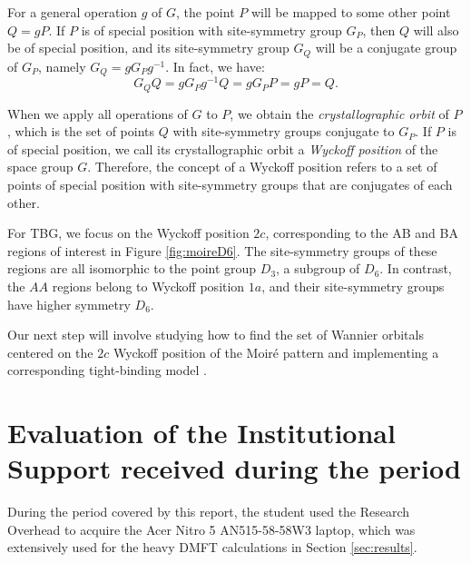 \documentclass[12pt]{report}
\begin{document}
For a general operation $g$ of $G$, the point $P$ will be mapped to some other point $Q = g P$. If $P$ is of special position with site-symmetry group $G_P$, then $Q$ will also be of special position, and its site-symmetry group $G_Q$ will be a conjugate group of $G_P$, namely $G_Q = g G_P g^{-1}$. In fact, we have:
\begin{equation} \label{eq:special-position}
G_Q Q = g G_P g^{-1} Q = g G_P P = g P = Q.
\end{equation}

When we apply all operations of $G$ to $P$, we obtain the \textit{crystallographic orbit} of $P$, which is the set of points $Q$ with site-symmetry groups conjugate to $G_P$. If $P$ is of special position, we call its crystallographic orbit a \textit{Wyckoff position} of the space group $G$. Therefore, the concept of a Wyckoff position refers to a set of points of special position with site-symmetry groups that are conjugates of each other.

\n

For TBG, we focus on the Wyckoff position $2c$, corresponding to the AB and BA regions of interest in Figure \ref{fig:moireD6}. The site-symmetry groups of these regions are all isomorphic to the point group $D_3$, a subgroup of $D_6$. In contrast, the $AA$ regions belong to Wyckoff position $1a$, and their site-symmetry groups have higher symmetry $D_6$.

Our next step will involve studying how to find the set of Wannier orbitals centered on the $2c$ Wyckoff position of the Moiré pattern and implementing a corresponding tight-binding model \cite{thesis_rennella}.





\pagebreak


\chapter{Evaluation of the Institutional Support received during the period} \label{chp:apoioInst}

During the period covered by this report, the student used the Research Overhead to acquire the Acer Nitro 5 AN515-58-58W3 laptop, which was extensively used for the heavy DMFT calculations in Section \ref{sec:results}.
\end{document}
